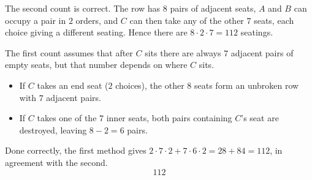 The second count is correct. The row has \(8\) pairs of adjacent seats, \(A\) and \(B\) can occupy a pair in \(2\) orders, and \(C\) can then take any of the other \(7\) seats, each choice giving a different seating. Hence there are \(8\cdot 2\cdot 7=112\) seatings.

The first count assumes that after \(C\) sits there are always \(7\) adjacent pairs of empty seats, but that number depends on where \(C\) sits.
\begin{itemize}
\item If \(C\) takes an end seat (\(2\) choices), the other \(8\) seats form an unbroken row with \(7\) adjacent pairs.
\item If \(C\) takes one of the \(7\) inner seats, both pairs containing \(C\)'s seat are destroyed, leaving \(8-2=6\) pairs.
\end{itemize}
Done correctly, the first method gives \(2\cdot 7\cdot 2+7\cdot 6\cdot 2=28+84=112\), in agreement with the second.
\[
\boxed{112}
\]

